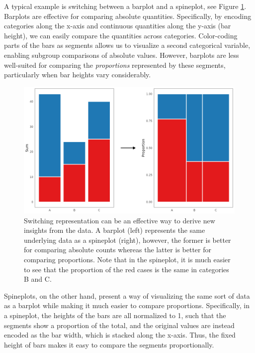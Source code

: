 \documentclass[
]{book}
\theoremstyle{definition}
\theoremstyle{definition}
\theoremstyle{definition}
\theoremstyle{definition}
\theoremstyle{remark}
\begin{document}
A typical example is switching between a barplot and a spineplot, see Figure \ref{fig:barplot-spineplot1}. Barplots are effective for comparing absolute quantities. Specifically, by encoding categories along the x-axis and continuous quantities along the y-axis (bar height), we can easily compare the quantities across categories. Color-coding parts of the bars as segments allows us to visualize a second categorical variable, enabling subgroup comparisons of absolute values. However, barplots are less well-suited for comparing the \emph{proportions} represented by these segments, particularly when bar heights vary considerably.

\begin{figure}

{\centering \includegraphics[width=1\linewidth,height=1\textheight]{./figures/barplot-spineplot} 

}

\caption{Switching representation can be an effective way to derive new insights from the data. A barplot (left) represents the same underlying data as a spineplot (right), however, the former is better for comparing absolute counts whereas the latter is better for comparing proportions. Note that in the spineplot, it is much easier to see that the proportion of the red cases is the same in categories B and C.}\label{fig:barplot-spineplot1}
\end{figure}

Spineplots, on the other hand, present a way of visualizing the same sort of data as a barplot while making it much easier to compare proportions. Specifically, in a spineplot, the heights of the bars are all normalized to 1, such that the segments show a proportion of the total, and the original values are instead encoded as the bar width, which is stacked along the x-axis. Thus, the fixed height of bars makes it easy to compare the segments proportionally.
\end{document}
